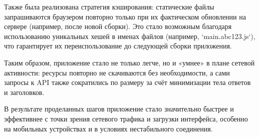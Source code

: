 Также была реализована стратегия кэширования: статические файлы запрашиваются браузером повторно только при их фактическом обновлении на сервере (например, после новой сборки). Это стало возможным благодаря использованию уникальных хешей в именах файлов (например, `main.abc123.js`), что гарантирует их переиспользование до следующей сборки приложения.

Таким образом, приложение стало не только легче, но и «умнее» в плане сетевой активности: ресурсы повторно не скачиваются без необходимости, а сами запросы к API также сократились по размеру за счёт минимизации тела ответов и заголовков.


В результате проделанных шагов приложение стало значительно быстрее и эффективнее с точки зрения сетевого трафика и загрузки интерфейса, особенно на мобильных устройствах и в условиях нестабильного соединения.
